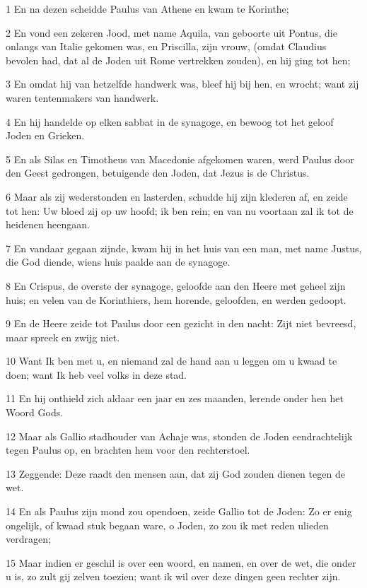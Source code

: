 \par 1 En na dezen scheidde Paulus van Athene en kwam te Korinthe;
\par 2 En vond een zekeren Jood, met name Aquila, van geboorte uit Pontus, die onlangs van Italie gekomen was, en Priscilla, zijn vrouw, (omdat Claudius bevolen had, dat al de Joden uit Rome vertrekken zouden), en hij ging tot hen;
\par 3 En omdat hij van hetzelfde handwerk was, bleef hij bij hen, en wrocht; want zij waren tentenmakers van handwerk.
\par 4 En hij handelde op elken sabbat in de synagoge, en bewoog tot het geloof Joden en Grieken.
\par 5 En als Silas en Timotheus van Macedonie afgekomen waren, werd Paulus door den Geest gedrongen, betuigende den Joden, dat Jezus is de Christus.
\par 6 Maar als zij wederstonden en lasterden, schudde hij zijn klederen af, en zeide tot hen: Uw bloed zij op uw hoofd; ik ben rein; en van nu voortaan zal ik tot de heidenen heengaan.
\par 7 En vandaar gegaan zijnde, kwam hij in het huis van een man, met name Justus, die God diende, wiens huis paalde aan de synagoge.
\par 8 En Crispus, de overste der synagoge, geloofde aan den Heere met geheel zijn huis; en velen van de Korinthiers, hem horende, geloofden, en werden gedoopt.
\par 9 En de Heere zeide tot Paulus door een gezicht in den nacht: Zijt niet bevreesd, maar spreek en zwijg niet.
\par 10 Want Ik ben met u, en niemand zal de hand aan u leggen om u kwaad te doen; want Ik heb veel volks in deze stad.
\par 11 En hij onthield zich aldaar een jaar en zes maanden, lerende onder hen het Woord Gods.
\par 12 Maar als Gallio stadhouder van Achaje was, stonden de Joden eendrachtelijk tegen Paulus op, en brachten hem voor den rechterstoel.
\par 13 Zeggende: Deze raadt den mensen aan, dat zij God zouden dienen tegen de wet.
\par 14 En als Paulus zijn mond zou opendoen, zeide Gallio tot de Joden: Zo er enig ongelijk, of kwaad stuk begaan ware, o Joden, zo zou ik met reden ulieden verdragen;
\par 15 Maar indien er geschil is over een woord, en namen, en over de wet, die onder u is, zo zult gij zelven toezien; want ik wil over deze dingen geen rechter zijn.
